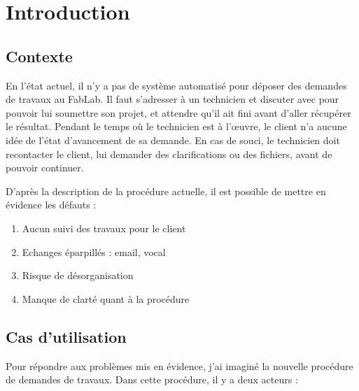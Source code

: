 \documentclass[
    iai, %
    eai, %
]{heig-tb}
\begin{document}
\maketitle
\frontmatter
\clearemptydoublepage

\preamble
\authentification

\begin{abstract}
  
\end{abstract}

\clearemptydoublepage
{
  \tableofcontents
  \let\cleardoublepage\clearpage
  \listoffigures
  \let\cleardoublepage\clearpage
  \listoftables
  \let\cleardoublepage\clearpage
  \listoflistings
}

\printnomenclature
\clearemptydoublepage
{}


\mainmatter
\chapter{Introduction}
\section{Contexte}
En l'état actuel, il n'y a pas de système automatisé pour déposer des demandes de travaux au FabLab. Il faut s'adresser à un technicien et discuter avec pour pouvoir lui soumettre son projet, et attendre qu'il ait fini avant d'aller récupérer le résultat. Pendant le temps où le technicien est à l'œuvre, le client n'a aucune idée de l'état d'avancement de sa demande. En cas de souci, le technicien doit recontacter le client, lui demander des clarifications ou des fichiers, avant de pouvoir continuer.

D'après la description de la procédure actuelle, il est possible de mettre en évidence les défauts :

\begin{enumerate}
  \item Aucun suivi des travaux pour le client
  \item Echanges éparpillés : email, vocal
  \item Risque de désorganisation
  \item Manque de clarté quant à la procédure
\end{enumerate}

\section{Cas d'utilisation}
Pour répondre aux problèmes mis en évidence, j'ai imaginé la nouvelle procédure de demandes de travaux. Dans cette procédure, il y a deux acteurs :
\end{document}
